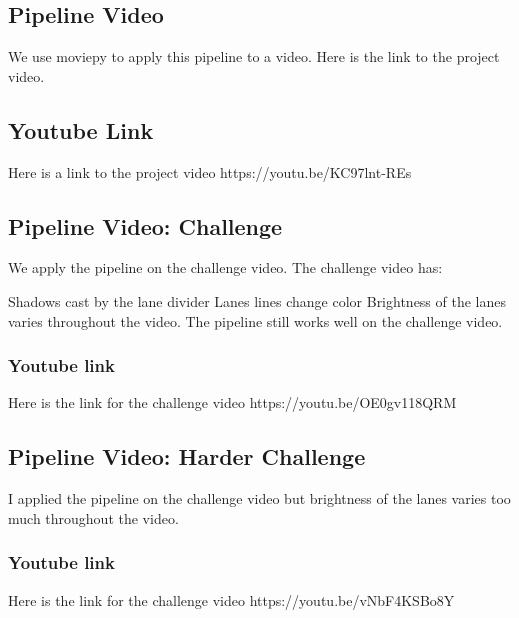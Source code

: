 \documentclass[11pt]{article}
\begin{document}
    \hypertarget{pipeline-video}{%
\subsection{Pipeline Video}\label{pipeline-video}}

We use moviepy to apply this pipeline to a video. Here is the link to
the project video.

\hypertarget{youtube-link}{%
\subsection{Youtube Link}\label{youtube-link}}

Here is a link to the project video https://youtu.be/KC97lnt-REs

    \hypertarget{pipeline-video-challenge}{%
\subsection{Pipeline Video: Challenge}\label{pipeline-video-challenge}}

We apply the pipeline on the challenge video. The challenge video has:

Shadows cast by the lane divider Lanes lines change color Brightness of
the lanes varies throughout the video. The pipeline still works well on
the challenge video.

\hypertarget{youtube-link}{%
\subsubsection{Youtube link}\label{youtube-link}}

Here is the link for the challenge video https://youtu.be/OE0gv118QRM

\hypertarget{pipeline-video-harder-challenge}{%
\subsection{Pipeline Video: Harder
Challenge}\label{pipeline-video-harder-challenge}}

I applied the pipeline on the challenge video but brightness of the
lanes varies too much throughout the video.

\hypertarget{youtube-link-1}{%
\subsubsection{Youtube link}\label{youtube-link-1}}

Here is the link for the challenge video https://youtu.be/vNbF4KSBo8Y
\end{document}
